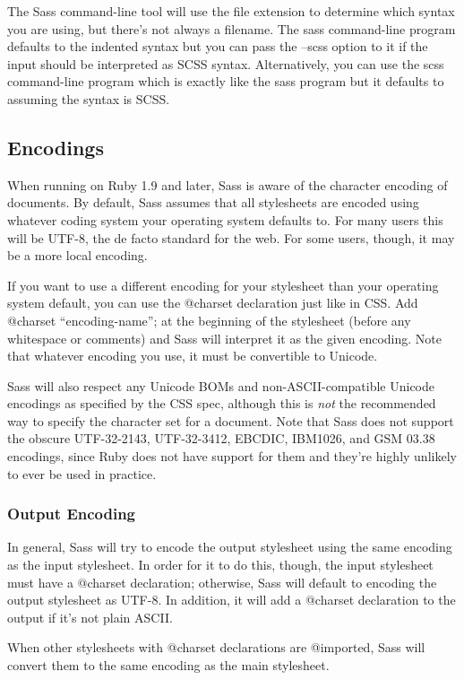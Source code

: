 \documentclass[10pt]{article}
\begin{document}
 The Sass command-line tool will use the file extension to determine which syntax you are using, but there’s not always a filename. The sass command-line program defaults to the indented syntax but you can pass the --scss option to it if the input should be interpreted as SCSS syntax. Alternatively, you can use the scss command-line program which is exactly like the sass program but it defaults to assuming the syntax is SCSS.
\subsection{Encodings}


 When running on Ruby 1.9 and later, Sass is aware of the character encoding of documents. By default, Sass assumes that all stylesheets are encoded using whatever coding system your operating system defaults to. For many users this will be UTF-8, the de facto standard for the web. For some users, though, it may be a more local encoding.


 If you want to use a different encoding for your stylesheet than your operating system default, you can use the @charset declaration just like in CSS. Add @charset ``encoding-name''; at the beginning of the stylesheet (before any whitespace or comments) and Sass will interpret it as the given encoding. Note that whatever encoding you use, it must be convertible to Unicode.


 Sass will also respect any Unicode BOMs and non-ASCII-compatible Unicode encodings as specified by the CSS spec, although this is \emph{not}
 the recommended way to specify the character set for a document. Note that Sass does not support the obscure UTF-32-2143, UTF-32-3412, EBCDIC, IBM1026, and GSM 03.38 encodings, since Ruby does not have support for them and they’re highly unlikely to ever be used in practice.
\subsubsection{Output Encoding}


 In general, Sass will try to encode the output stylesheet using the same encoding as the input stylesheet. In order for it to do this, though, the input stylesheet must have a @charset declaration; otherwise, Sass will default to encoding the output stylesheet as UTF-8. In addition, it will add a @charset declaration to the output if it’s not plain ASCII.


 When other stylesheets with @charset declarations are @imported, Sass will convert them to the same encoding as the main stylesheet.
\end{document}
